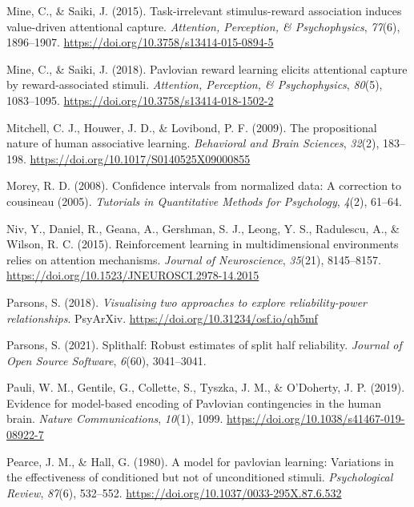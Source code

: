 \documentclass[
  man,
  floatsintext,
  longtable,
  nolmodern,
  notxfonts,
  notimes,
  mask,
  colorlinks=true,linkcolor=blue,citecolor=blue,urlcolor=blue]{apa7}
\newlength{\cslhangindent}
\newenvironment{CSLReferences}[2] %
 {\begin{list}{}{%
  \setlength{\itemindent}{0pt}
  \setlength{\leftmargin}{0pt}
  \setlength{\parsep}{0pt}
  \ifodd #1
   \setlength{\leftmargin}{\cslhangindent}
   \setlength{\itemindent}{-1\cslhangindent}
  \fi
  \setlength{\itemsep}{#2\baselineskip}}}
 {\end{list}}
\begin{document}
\begin{CSLReferences}{1}{0}
Mine, C., \& Saiki, J. (2015). Task-irrelevant stimulus-reward
association induces value-driven attentional capture. \emph{Attention,
Perception, \& Psychophysics}, \emph{77}(6), 1896--1907.
\url{https://doi.org/10.3758/s13414-015-0894-5}

Mine, C., \& Saiki, J. (2018). Pavlovian reward learning elicits
attentional capture by reward-associated stimuli. \emph{Attention,
Perception, \& Psychophysics}, \emph{80}(5), 1083--1095.
\url{https://doi.org/10.3758/s13414-018-1502-2}

Mitchell, C. J., Houwer, J. D., \& Lovibond, P. F. (2009). The
propositional nature of human associative learning. \emph{Behavioral and
Brain Sciences}, \emph{32}(2), 183--198.
\url{https://doi.org/10.1017/S0140525X09000855}

Morey, R. D. (2008). Confidence intervals from normalized data: A
correction to cousineau (2005). \emph{Tutorials in Quantitative Methods
for Psychology}, \emph{4}(2), 61--64.

Niv, Y., Daniel, R., Geana, A., Gershman, S. J., Leong, Y. S.,
Radulescu, A., \& Wilson, R. C. (2015). Reinforcement learning in
multidimensional environments relies on attention mechanisms.
\emph{Journal of Neuroscience}, \emph{35}(21), 8145--8157.
\url{https://doi.org/10.1523/JNEUROSCI.2978-14.2015}

Parsons, S. (2018). \emph{Visualising two approaches to explore
reliability-power relationships}. PsyArXiv.
\url{https://doi.org/10.31234/osf.io/qh5mf}

Parsons, S. (2021). Splithalf: Robust estimates of split half
reliability. \emph{Journal of Open Source Software}, \emph{6}(60),
3041--3041.

Pauli, W. M., Gentile, G., Collette, S., Tyszka, J. M., \& O'Doherty, J.
P. (2019). Evidence for model-based encoding of Pavlovian contingencies
in the human brain. \emph{Nature Communications}, \emph{10}(1), 1099.
\url{https://doi.org/10.1038/s41467-019-08922-7}

Pearce, J. M., \& Hall, G. (1980). A model for pavlovian learning:
Variations in the effectiveness of conditioned but not of unconditioned
stimuli. \emph{Psychological Review}, \emph{87}(6), 532--552.
\url{https://doi.org/10.1037/0033-295X.87.6.532}


\end{CSLReferences}
\end{document}
